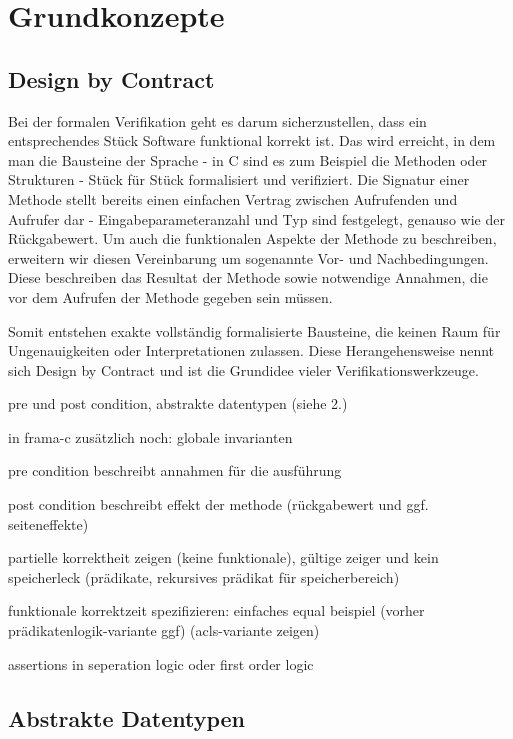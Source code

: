 ﻿
\chapter{Grundkonzepte}

\section{Design by Contract}
\label{sec:design-by-contract}

Bei der formalen Verifikation geht es darum sicherzustellen, dass ein entsprechendes Stück Software
funktional korrekt ist. Das wird erreicht, in dem man die Bausteine der Sprache - in C sind es zum Beispiel die Methoden 
oder Strukturen -
Stück für Stück formalisiert und verifiziert. Die Signatur einer Methode stellt bereits einen einfachen Vertrag zwischen
Aufrufenden und Aufrufer dar - Eingabeparameteranzahl und Typ sind festgelegt, genauso wie der Rückgabewert.
Um auch die funktionalen Aspekte der Methode zu beschreiben, erweitern wir diesen Vereinbarung um sogenannte Vor- und Nachbedingungen.
Diese beschreiben das Resultat der Methode sowie notwendige Annahmen, die vor dem Aufrufen der Methode gegeben sein müssen. 

Somit entstehen exakte vollständig formalisierte Bausteine, die keinen Raum für Ungenauigkeiten oder Interpretationen zulassen.
Diese Herangehensweise nennt sich Design by Contract und ist die Grundidee  vieler Verifikationswerkzeuge.


pre und post condition, abstrakte datentypen (siehe 2.)


in frama-c zusätzlich noch: globale invarianten
  
  
pre condition beschreibt annahmen für die ausführung
  
  
post condition beschreibt effekt der methode 
  (rückgabewert und ggf. seiteneffekte)

  
partielle korrektheit zeigen (keine funktionale), gültige zeiger und kein speicherleck
(prädikate, rekursives prädikat für speicherbereich)
  
funktionale korrektzeit spezifizieren: einfaches equal beispiel 
(vorher prädikatenlogik-variante ggf)
(acls-variante zeigen)


assertions in seperation logic oder first order logic


\section{Abstrakte Datentypen}

